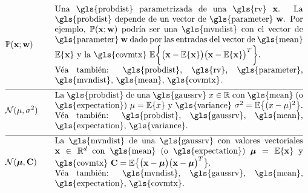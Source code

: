 \newpage
\begin{align} 
	&\prob{\featurevec;\weights} &\quad & \parbox{.85\textwidth}{Una \gls{probdist} parametrizada de una \gls{rv} $\featurevec$. 
		La \gls{probdist} depende de un vector de \gls{parameter} $\weights$. Por ejemplo, $\prob{\featurevec;\weights}$ podría ser una 
		\gls{mvndist} con el vector de \gls{parameter} $\weights$ dado por las entradas del vector de \gls{mean} $\expect \{ \featurevec \}$ 
		y la \gls{covmtx} $\expect \bigg \{ \big( \featurevec - \expect \{ \featurevec \}\big) \big( \featurevec - \expect \{ \featurevec \}\big)^{T}  \bigg\}$.
		\\ Véa también: \gls{probdist}, \gls{rv}, \gls{parameter}, \gls{mvndist}, \gls{mean}, \gls{covmtx}.} \nonumber \\[2mm] \hline \nonumber\\[-5mm]
	&\mathcal{N}(\mu, \sigma^{2}) &\quad & \parbox{.85\textwidth}{La \gls{probdist} de una 
		\gls{gaussrv} $\feature \in \mathbb{R}$ con \gls{mean} (o \gls{expectation}) $\mu= \expect \{ \feature \}$ 
		y \gls{variance} $\sigma^{2} = \expect \big\{ ( \feature - \mu )^2 \big\}$.
		\\ Véa también: \gls{probdist}, \gls{gaussrv}, \gls{mean}, \gls{expectation}, \gls{variance}.} \nonumber \\[2mm] \hline \nonumber\\[-5mm]
	&\mathcal{N}(\meanvecgeneric, \mathbf{C}) &\quad & \parbox{.85\textwidth}{La \gls{mvndist} de una \gls{gaussrv} con valores vectoriales 
		$\featurevec \in \mathbb{R}^{\featuredim}$ con \gls{mean} (o \gls{expectation}) $\meanvecgeneric= \expect \{ \featurevec \}$ 
		y \gls{covmtx} $\mathbf{C} = \expect \big\{ \big( \featurevec - \meanvecgeneric \big)\big( \featurevec - \meanvecgeneric \big)^{T} \big\}$.
		\\ Véa también: \gls{mvndist}, \gls{gaussrv}, \gls{mean}, \gls{expectation}, \gls{covmtx}.} \nonumber                                             
\end{align}





\newpage

